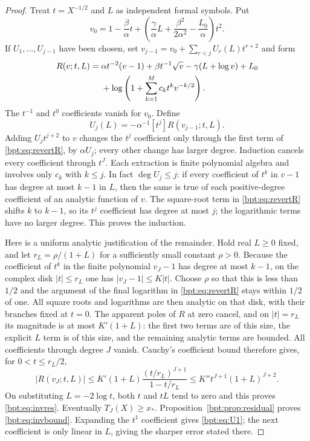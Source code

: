 \documentclass[11pt]{article}
\theoremstyle{remark}\newtheorem{remark}[theorem]{Remark}
\begin{document}
\begin{proof}
Treat $t=X^{-1/2}$ and $L$ as independent formal symbols. Put
\[
 v_0=1-\frac\beta\alpha t+
 \left(\frac\gamma\alpha L+\frac{\beta^2}{2\alpha^2}-\frac{L_0}\alpha\right)t^2.
\]
If $U_1,\ldots,U_{j-1}$ have been chosen, set
$v_{j-1}=v_0+\sum_{r<j}U_r(L)t^{r+2}$ and form
\begin{align}\label{bpt:eq:revertR}
 R(v;t,L)={}&\alpha t^{-2}(v-1)+\beta t^{-1}\sqrt v
             -\gamma(L+\log v)+L_0\notag\\
          &+\log\left(1+\sum_{k=1}^Mc_kt^kv^{-k/2}\right).
\end{align}
The $t^{-1}$ and $t^0$ coefficients vanish for $v_0$. Define
\begin{equation}\label{bpt:eq:Urec}
 U_j(L)=-\alpha^{-1}[t^j]R(v_{j-1};t,L).
\end{equation}
Adding $U_jt^{j+2}$ to $v$ changes the $t^j$ coefficient only through the first term of \eqref{bpt:eq:revertR}, by $\alpha U_j$; every other change has larger degree. Induction cancels every coefficient through $t^J$. Each extraction is finite polynomial algebra and involves only $c_k$ with $k\le j$. In fact $\deg U_j\le j$: if every coefficient of $t^k$ in $v-1$ has degree at most $k-1$ in $L$, then the same is true of each positive-degree coefficient of an analytic function of $v$. The square-root term in \eqref{bpt:eq:revertR} shifts $k$ to $k-1$, so its $t^j$ coefficient has degree at most $j$; the logarithmic terms have no larger degree. This proves the induction.

Here is a uniform analytic justification of the remainder. Hold real $L\ge0$ fixed, and let $r_L=\rho/(1+L)$ for a sufficiently small constant $\rho>0$. Because the coefficient of $t^k$ in the finite polynomial $v_J-1$ has degree at most $k-1$, on the complex disk $|t|\le r_L$ one has $|v_J-1|\le K|t|$. Choose $\rho$ so that this is less than $1/2$ and the argument of the final logarithm in \eqref{bpt:eq:revertR} stays within $1/2$ of one. All square roots and logarithms are then analytic on that disk, with their branches fixed at $t=0$.
The apparent poles of $R$ at zero cancel, and on $|t|=r_L$ its magnitude is at most $K'(1+L)$: the first two terms are of this size, the explicit $L$ term is of this size, and the remaining analytic terms are bounded. All coefficients through degree $J$ vanish. Cauchy's coefficient bound therefore gives, for $0<t\le r_L/2$,
\[
 |R(v_J;t,L)|\le
 K'(1+L)\frac{(t/r_L)^{J+1}}{1-t/r_L}
 \le K''t^{J+1}(1+L)^{J+2}.
\]
On substituting $L=-2\log t$, both $t$ and $tL$ tend to zero and this proves \eqref{bpt:eq:invres}. Eventually $T_J(X)\ge x_*$. Proposition~\ref{bpt:prop:residual} proves \eqref{bpt:eq:invbound}. Expanding the $t^1$ coefficient gives \eqref{bpt:eq:U1}; the next coefficient is only linear in $L$, giving the sharper error stated there.
\end{proof}
\end{document}
